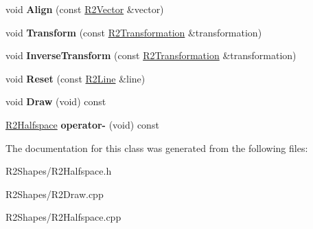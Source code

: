 \begin{DoxyCompactItemize}
\item 
void {\bfseries Align} (const \hyperlink{class_r2_vector}{R2\+Vector} \&vector)\hypertarget{class_r2_halfspace_a58986cfaedda6facb3e70663f6cb3cae}{}\label{class_r2_halfspace_a58986cfaedda6facb3e70663f6cb3cae}

\item 
void {\bfseries Transform} (const \hyperlink{class_r2_transformation}{R2\+Transformation} \&transformation)\hypertarget{class_r2_halfspace_a94234e3bfbe7efaab78e19a0f0378dc1}{}\label{class_r2_halfspace_a94234e3bfbe7efaab78e19a0f0378dc1}

\item 
void {\bfseries Inverse\+Transform} (const \hyperlink{class_r2_transformation}{R2\+Transformation} \&transformation)\hypertarget{class_r2_halfspace_ad86782b5122bdcc4672461b21cbbc4f2}{}\label{class_r2_halfspace_ad86782b5122bdcc4672461b21cbbc4f2}

\item 
void {\bfseries Reset} (const \hyperlink{class_r2_line}{R2\+Line} \&line)\hypertarget{class_r2_halfspace_a7b81fcff1efedba4df731871548de6f7}{}\label{class_r2_halfspace_a7b81fcff1efedba4df731871548de6f7}

\item 
void {\bfseries Draw} (void) const \hypertarget{class_r2_halfspace_a5c131874769bb164f0c263afea6418ee}{}\label{class_r2_halfspace_a5c131874769bb164f0c263afea6418ee}

\item 
\hyperlink{class_r2_halfspace}{R2\+Halfspace} {\bfseries operator-\/} (void) const \hypertarget{class_r2_halfspace_ae0d995d97d5fad25199fef7ea49bac63}{}\label{class_r2_halfspace_ae0d995d97d5fad25199fef7ea49bac63}

\end{DoxyCompactItemize}


The documentation for this class was generated from the following files\+:\begin{DoxyCompactItemize}
\item 
R2\+Shapes/R2\+Halfspace.\+h\item 
R2\+Shapes/R2\+Draw.\+cpp\item 
R2\+Shapes/R2\+Halfspace.\+cpp\end{DoxyCompactItemize}
